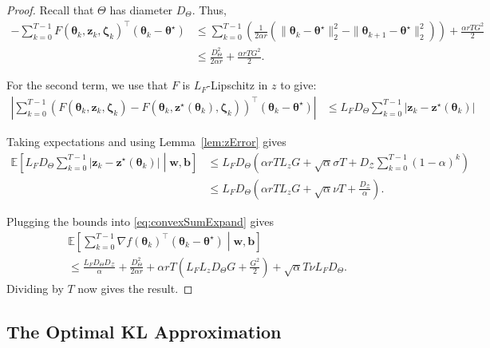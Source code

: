 \documentclass[twoside]{article}
\theoremstyle{definition}
\newcommand{\E}{\mathbb{E}}
\newcommand{\cZ}{\mathcal{Z}}
\newcommand{\1}[1]{\scalebox{1.25}{$\mathds{1}$}\left[#1\right]}
\begin{document}
\begin{proof}
Recall that $\Theta$ has diameter $D_{\Theta}$. 
Thus,
\begin{align*}
-\sum_{k=0}^{T-1}F(\bm{\theta}_k,\bm{z}_k,\bm{\zeta}_k)^\top (\bm{\theta}_k-\bm{\theta}^\star) &\le \sum_{k=0}^{T-1} \left(\frac{1}{2\alpha r}\left(
\|\bm{\theta}_k-\bm{\theta}^\star\|_2^2
-\|\bm{\theta}_{k+1}-\bm{\theta}^\star\|_2^2
\right) \right)+ \frac{\alpha rT G^2}{2} \\
&\le\frac{D_{\Theta}^2}{2\alpha r}+\frac{\alpha r TG^2}{2}.
\end{align*}

For the second term, we use that $F$ is $L_F$-Lipschitz in $z$ to give:
\begin{align*}
\left|\sum_{k=0}^{T-1}\left(F(\bm{\theta}_k,\bm{z}_k,\bm{\zeta}_k)-
F(\bm{\theta}_k,\bm{z}^\star(\bm{\theta}_k),\bm{\zeta}_k)
\right)^\top (\bm{\theta}_k-\bm{\theta}^\star)
\right|&\le L_F D_{\Theta}\sum_{k=0}^{T-1}|\bm{z}_k-\bm{z}^\star(\bm{\theta}_k)|
\end{align*}

Taking expectations and using Lemma~\ref{lem:zError} gives
\begin{align*}
\E\left[
L_F D_{\Theta}\sum_{k=0}^{T-1}|\bm{z}_k-\bm{z}^\star(\bm{\theta}_k)|
\middle|\bm{w},\bm{b}
\right] &\le 
L_F D_{\Theta}\left(
\alpha r T L_z G + \sqrt{\alpha}\sigma T
+
D_{\cZ}
\sum_{k=0}^{T-1}(1-\alpha)^k
\right) \\
&\le 
L_F D_{\Theta}\left(
\alpha r T L_z G + \sqrt{\alpha}\nu T
+
\frac{D_{\cZ}}{\alpha}
\right).
\end{align*}

Plugging the bounds into \eqref{eq:convexSumExpand} gives
\begin{multline*}
\E\left[
\sum_{k=0}^{T-1}\nabla f(\bm{\theta}_k)^\top(\bm{\theta}_k-\bm{\theta}^\star)
\middle| \bm{w},\bm{b}
\right]\\\le \frac{L_F D_{\Theta} D_{\cZ}}{\alpha}+\frac{D_{\Theta}^2}{2\alpha r}+
\alpha r T\left(
L_FL_z D_{\Theta}G+\frac{G^2}{2}
\right)
+\sqrt{\alpha}T \nu L_F D_{\Theta}.
\end{multline*}
Dividing by $T$ now gives the result.
\end{proof}

\subsection{The Optimal KL Approximation}
\label{appss:klApprox}
\end{document}
